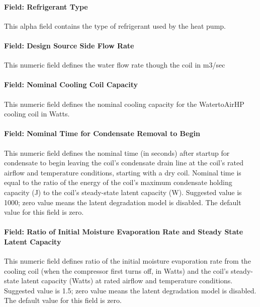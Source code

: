 \paragraph{Field: Refrigerant Type}\label{field-refrigerant-type}

This alpha field contains the type of refrigerant used by the heat pump.

\paragraph{Field: Design Source Side Flow Rate}\label{field-design-source-side-flow-rate}

This numeric field defines the water flow rate though the coil in m3/sec

\paragraph{Field: Nominal Cooling Coil Capacity}\label{field-nominal-cooling-coil-capacity}

This numeric field defines the nominal cooling capacity for the WatertoAirHP cooling coil in Watts.

\paragraph{Field: Nominal Time for Condensate Removal to Begin}\label{field-nominal-time-for-condensate-removal-to-begin-3}

This numeric field defines the nominal time (in seconds) after startup for condensate to begin leaving the coil's condensate drain line at the coil's rated airflow and temperature conditions, starting with a dry coil. Nominal time is equal to the ratio of the energy of the coil's maximum condensate holding capacity (J) to the coil's steady-state latent capacity (W). Suggested value is 1000; zero value means the latent degradation model is disabled. The default value for this field is zero.

\paragraph{Field: Ratio of Initial Moisture Evaporation Rate and Steady State Latent Capacity}\label{field-ratio-of-initial-moisture-evaporation-rate-and-steady-state-latent-capacity-3}

This numeric field defines ratio of the initial moisture evaporation rate from the cooling coil (when the compressor first turns off, in Watts) and the coil's steady-state latent capacity (Watts) at rated airflow and temperature conditions. Suggested value is 1.5; zero value means the latent degradation model is disabled. The default value for this field is zero.

